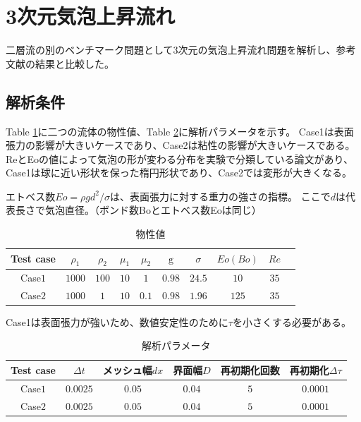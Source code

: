 \newpage
\section{3次元気泡上昇流れ}

二層流の別のベンチマーク問題として3次元の気泡上昇流れ問題を解析し、参考文献の結果と比較した。

\subsection{解析条件}

Table \ref{table:3d-bubble-material-property}に二つの流体の物性値、Table \ref{table:3d-bubble-parameter}に解析パラメータを示す。
Case1は表面張力の影響が大きいケースであり、Case2は粘性の影響が大きいケースである。
ReとEoの値によって気泡の形が変わる分布を実験で分類している論文があり、Case1は球に近い形状を保った楕円形状であり、Case2では変形が大きくなる。

エトベス数$Eo = \rho g d^2 / \sigma$は、表面張力に対する重力の強さの指標。
ここで$d$は代表長さで気泡直径。（ボンド数Boとエトベス数Eoは同じ）



\renewcommand{\arraystretch}{1}
\begin{table}[H]
	\centering
	\caption{物性値}
	\begin{tabular}{cccccccccc}
		\hline
		Test case & $\rho_1$ & $\rho_2$ & $\mu_1$ & $\mu_2$ & $\mathrm{g}$ & $\sigma$ & $Eo (Bo)$ & $Re$ \\
		\hline 
		Case$1$ & $1000$ & $100$ & $10$ & $1$   & $0.98$ & $24.5$ & $10$ & $35$\\
		Case$2$ & $1000$ & $1$   & $10$ & $0.1$ & $0.98$ & $1.96$ & $125$ & $35$\\ 
		\hline         
	\end{tabular}
	\label{table:3d-bubble-material-property}
\end{table}
\renewcommand{\arraystretch}{1.0}

Case1は表面張力が強いため、数値安定性のために$\tau$を小さくする必要がある。\cite{Yamaguchi2018}

\renewcommand{\arraystretch}{1}
\begin{table}[H]
	\centering
	\caption{解析パラメータ}
	\begin{tabular}{cccccc}
		\hline
		Test case & $\Delta t$ & メッシュ幅$dx$ & 界面幅$D$ & 再初期化回数 & 再初期化$\Delta \tau$\\
		\hline 
		Case$1$ & $0.0025$ & $0.05$ & $0.04$ & $5$ & $0.0001$\\
		Case$2$ & $0.0025$ & $0.05$ & $0.04$ & $5$ & $0.0001$\\
		\hline         
	\end{tabular}
	\label{table:3d-bubble-parameter}
\end{table}
\renewcommand{\arraystretch}{1.0}

